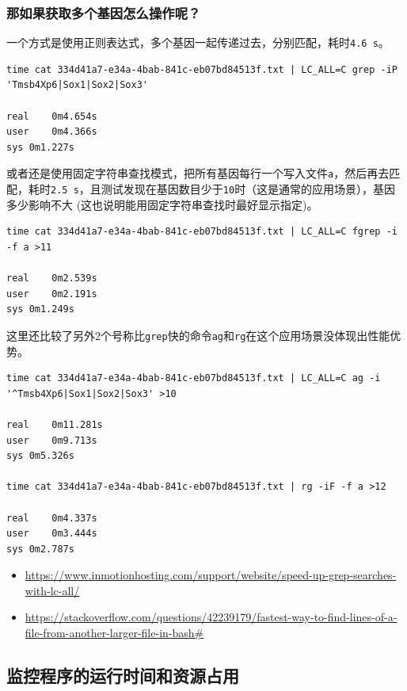 \documentclass[]{article}
\providecommand{\tightlist}{%
  \setlength{\itemsep}{0pt}\setlength{\parskip}{0pt}}
\numberwithin{figure}{section}
\numberwithin{table}{section}
\begin{document}
\hypertarget{grep_multiple_gene}{%
\subsubsection{那如果获取多个基因怎么操作呢？}\label{grep_multiple_gene}}

一个方式是使用正则表达式，多个基因一起传递过去，分别匹配，耗时\texttt{4.6\ s}。

\begin{verbatim}
time cat 334d41a7-e34a-4bab-841c-eb07bd84513f.txt | LC_ALL=C grep -iP 'Tmsb4Xp6|Sox1|Sox2|Sox3'

real	0m4.654s
user	0m4.366s
sys	0m1.227s
\end{verbatim}

或者还是使用固定字符串查找模式，把所有基因每行一个写入文件\texttt{a}，然后再去匹配，耗时\texttt{2.5\ s}，且测试发现在基因数目少于\texttt{10}时（这是通常的应用场景），基因多少影响不大 (这也说明能用固定字符串查找时最好显示指定)。

\begin{verbatim}
time cat 334d41a7-e34a-4bab-841c-eb07bd84513f.txt | LC_ALL=C fgrep -i -f a >11

real	0m2.539s
user	0m2.191s
sys	0m1.249s
\end{verbatim}

这里还比较了另外2个号称比\texttt{grep}快的命令\texttt{ag}和\texttt{rg}在这个应用场景没体现出性能优势。

\begin{verbatim}
time cat 334d41a7-e34a-4bab-841c-eb07bd84513f.txt | LC_ALL=C ag -i '^Tmsb4Xp6|Sox1|Sox2|Sox3' >10

real	0m11.281s
user	0m9.713s
sys	0m5.326s

time cat 334d41a7-e34a-4bab-841c-eb07bd84513f.txt | rg -iF -f a >12

real	0m4.337s
user	0m3.444s
sys	0m2.787s
\end{verbatim}

\begin{itemize}
\tightlist
\item
  \url{https://www.inmotionhosting.com/support/website/speed-up-grep-searches-with-lc-all/}
\item
  \url{https://stackoverflow.com/questions/42239179/fastest-way-to-find-lines-of-a-file-from-another-larger-file-in-bash\#}
\end{itemize}

\hypertarget{top}{%
\subsection{监控程序的运行时间和资源占用}\label{top}}
\end{document}
